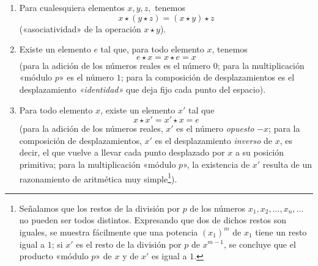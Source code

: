 \documentclass[a4paper, 12pt, draft]{article}
\begin{document}
\begin{enumerate} [\indent a) ]
\vspace{- 1em}

\item Para cualesquiera elementos $x, y, z,$ tenemos $$ x\star (y \star z)=(x \star y) \star z $$ («asociatividad» de la operación $x\star y$).

\item Existe un elemento $e$ tal que, para todo elemento $x$, tenemos $$ e\star x=x \star e=x $$ (para la adición de los números reales es el número $0$; para la multiplicación «módulo $p$» es el número $1$; para la composición de desplazamientos es el desplazamiento \textit{«identidad»} que deja fijo cada punto del espacio).

\item Para todo elemento $x$, existe un elemento $x'$ tal que $$ x\star x' = x'\star x=e $$ (para la adición de los números reales, $x'$ es el número \textit{opuesto} $-x$; para la composición de desplazamientos, $x'$ es el desplazamiento \textit{inverso} de $x$, es decir, el que vuelve a llevar cada punto desplazado por $x$ a su posición primitiva; para la multiplicación «módulo $p$», la existencia de $x'$ resulta de un razonamiento de aritmética muy simple\footnote{Señalamos que los restos de la división por $p$ de los números $x_{1}, x_{2},..., x_{n},\dots $ no pueden ser todos distintos. Expresando que dos de dichos restos son iguales, se muestra fácilmente que una potencia $(x_{1})^{m}$ de $x_{1}$ tiene un resto igual a $1$; si $x'$ es el resto de la división por $p$ de $x^{m-1}$, se concluye que el producto «módulo $p$» de $x$ y de $x'$ es igual a $1$.}).

\end{enumerate}
\end{document}
